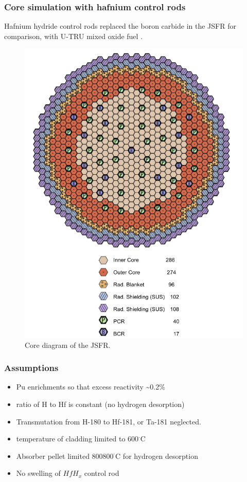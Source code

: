 \documentclass[9pt]{beamer}
\newcommand{\hfh}{$HfH_{x}$\xspace}
\begin{document}
\begin{frame}
\frametitle{Core simulation with hafnium control rods}
Hafnium hydride control rods replaced the boron carbide in the
\gls{JSFR} \cite{ogura_conceptual_2009} for comparison, with U-TRU mixed oxide fuel \cite{ikeda_application_2014}.
\begin{figure}[htbp!]
  \begin{center}
      \includegraphics[scale=0.15]{./images/core.png}
  \end{center}
  \caption{Core diagram of the \gls{JSFR}.}
  \label{fig:core}
\end{figure}
\end{frame}

\begin{frame}
\frametitle{Assumptions}
\begin{itemize}
    \item Pu enrichments so that excess reactivity \textasciitilde 0.2\% 
    \item ratio of H to Hf is constant (no hydrogen desorption)
    \item Transmutation from H-180 to Hf-181, or Ta-181 neglected.
    \item temperature of cladding limited to 600$^\cdot$C
    \item Absorber pellet limited 800$800^\cdot$C for hydrogen desorption
    \item No swelling of \hfh control rod
\end{itemize}
\end{frame}
\end{document}
